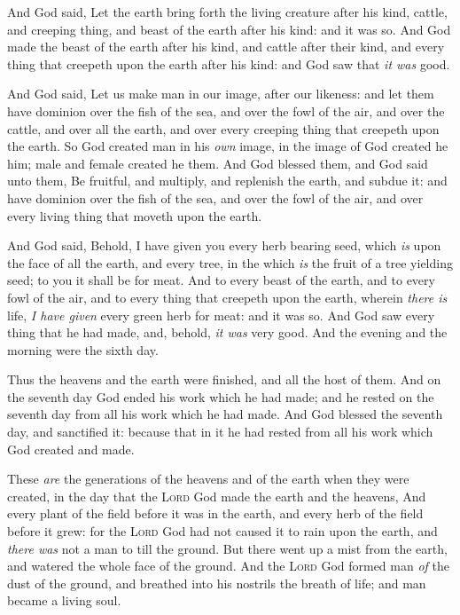 \documentclass[11pt,letterpaper,oneside]{memoir}
\begin{document}
And God said, Let the earth bring forth the living creature after his
kind, cattle, and creeping thing, and beast of the earth after his kind:
and it was so. And God made the beast of the earth after his kind, and
cattle after their kind, and every thing that creepeth upon the earth
after his kind: and God saw that \emph{it was} good.

And God said, Let us make man in our image, after our likeness: and let
them have dominion over the fish of the sea, and over the fowl of the
air, and over the cattle, and over all the earth, and over every
creeping thing that creepeth upon the earth. So God created man in his
\emph{own} image, in the image of God created he him; male and female
created he them. And God blessed them, and God said unto them, Be
fruitful, and multiply, and replenish the earth, and subdue it: and have
dominion over the fish of the sea, and over the fowl of the air, and
over every living thing that moveth upon the earth.

And God said, Behold, I have given you every herb bearing seed, which
\emph{is} upon the face of all the earth, and every tree, in the which
\emph{is} the fruit of a tree yielding seed; to you it shall be for
meat. And to every beast of the earth, and to every fowl of the air, and
to every thing that creepeth upon the earth, wherein \emph{there is} life,
\emph{I have given} every green herb for meat: and it was so. And God
saw every thing that he had made, and, behold, \emph{it was} very good.
And the evening and the morning were the sixth day.

Thus the heavens and the earth were finished, and all the host of them.
And on the seventh day God ended his work which he had made; and he
rested on the seventh day from all his work which he had made. And God
blessed the seventh day, and sanctified it: because that in it he had
rested from all his work which God created and made.

These \emph{are} the generations of the heavens and of the earth when
they were created, in the day that the \textsc{Lord} God made the earth
and the heavens, And every plant of the field before it was in the
earth, and every herb of the field before it grew: for the \textsc{Lord}
God had not caused it to rain upon the earth, and \emph{there was} not a
man to till the ground. But there went up a mist from the earth, and
watered the whole face of the ground. And the \textsc{Lord} God formed man
\emph{of} the dust of the ground, and breathed into his nostrils the
breath of life; and man became a living soul.
\end{document}
